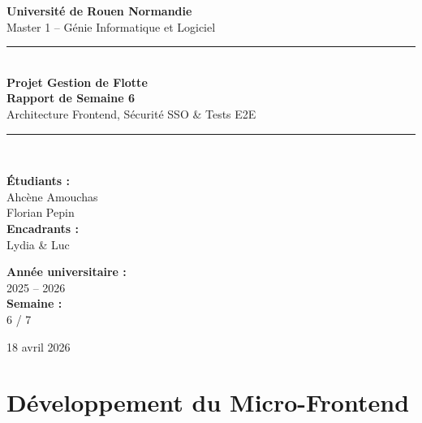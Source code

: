 \documentclass[12pt,a4paper]{article}
\begin{document}
\begin{titlepage}
  \centering
  \vspace*{1cm}

  {\Large\textbf{Universit\'{e} de Rouen Normandie}\\[0.3cm]
  \large Master 1 -- G\'{e}nie Informatique et Logiciel}

  \vspace{1.5cm}
  {\color{primary!55}\rule{\linewidth}{0.5mm}}\\[0.45cm]

  {\Huge\sffamily\bfseries\color{primary} Projet Gestion de Flotte\\[0.35cm]}
  {\LARGE\sffamily\bfseries\color{primary!80!black} Rapport de Semaine 6}\\[0.35cm]
  {\large\sffamily\color{primary!65!black} Architecture Frontend, S\'{e}curit\'{e} SSO \& Tests E2E}

  {\color{primary!55}\rule{\linewidth}{0.5mm}}\\[1.5cm]

  \begin{minipage}{0.45\textwidth}
    \begin{flushleft}
      \textbf{\'{E}tudiants :}\\
      Ahc\`{e}ne Amouchas \\
      Florian Pepin \\[0.5cm]
      \textbf{Encadrants :}\\
      Lydia \& Luc
    \end{flushleft}
  \end{minipage}
  \hfill
  \begin{minipage}{0.45\textwidth}
    \begin{flushright}
      \textbf{Ann\'{e}e universitaire :}\\
      2025 -- 2026 \\[0.5cm]
      \textbf{Semaine :}\\
      6 / 7
    \end{flushright}
  \end{minipage}

  \vfill
  {\large 18 avril 2026}
\end{titlepage}

\tableofcontents
\newpage

\section{D\'{e}veloppement du Micro-Frontend}
\end{document}
